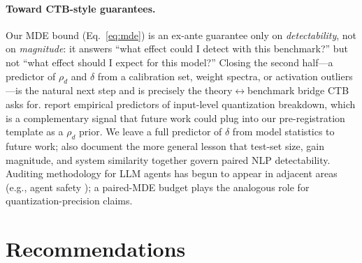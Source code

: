 \documentclass{article}
\begin{document}
\paragraph{Toward CTB-style guarantees.}
Our MDE bound (Eq.~\ref{eq:mde}) is an ex-ante guarantee only on \emph{detectability}, not on \emph{magnitude}: it answers ``what effect could I detect with this benchmark?'' but not ``what effect should I expect for this model?'' Closing the second half---a predictor of $\rho_d$ and $\delta$ from a calibration set, weight spectra, or activation outliers---is the natural next step and is precisely the theory$\leftrightarrow$benchmark bridge CTB asks for. \citet{chang2025why} report empirical predictors of input-level quantization breakdown, which is a complementary signal that future work could plug into our pre-registration template as a $\rho_d$ prior. We leave a full predictor of $\delta$ from model statistics to future work; \citet{bergkirkpatrick2012empirical} also document the more general lesson that test-set size, gain magnitude, and system similarity together govern paired NLP detectability. Auditing methodology for LLM agents has begun to appear in adjacent areas (e.g., agent safety \citep{luo2025agentauditor}); a paired-MDE budget plays the analogous role for quantization-precision claims.

\section{Recommendations}
\label{sec:recs}
\end{document}
